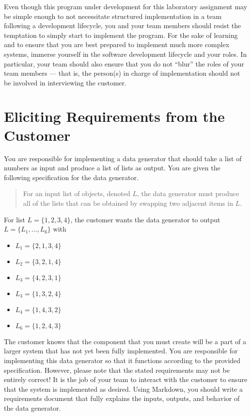 Even though this program under development for this laboratory assignment may be simple enough to not necessitate
structured implementation in a team following a development lifecycle, you and your team members should resist the
temptation to simply start to implement the program. For the sake of learning and to ensure that you are best prepared
to implement much more complex systems, immerse yourself in the software development lifecycle and your roles. In
particular, your team should also ensure that you do not ``blur'' the roles of your team members --- that is, the
person(s) in charge of implementation should not be involved in interviewing the customer.

\section*{Eliciting Requirements from the Customer}

You are responsible for implementing a data generator that should take a list of numbers as input and produce a list of
lists as output.  You are given the following specification for the data generator.

\begin{quote}
For an input list of objects, denoted $L$, the data generator must produce all of the lists that can be obtained by swapping two
adjacent items in $L$.
\end{quote}

\noindent
For list $L = \{1, 2, 3, 4\}$, the customer wants the data generator to output $L=\{L_1, \ldots, L_6\}$ with

\begin{itemize}
    \item[] $L_1 = \{2, 1, 3, 4\}$
    \item[] $L_2 = \{3, 2, 1, 4\}$
    \item[] $L_3 = \{4, 2, 3, 1\}$
    \item[] $L_3 = \{1, 3, 2, 4\}$
    \item[] $L_4 = \{1, 4, 3, 2\}$
    \item[] $L_6 = \{1, 2, 4, 3\}$
\end{itemize}

The customer knows that the component that you must create will be a part of a larger system that has not yet been
fully implemented.  You are responsible for implementing this data generator so that it functions according to the
provided specification.  However, please note that the stated requirements may not be entirely correct!  It is the job
of your team to interact with the customer to ensure that the system is implemented as desired.  Using Markdown, you
should write a requirements document that fully explains the inputs, outputs, and behavior of the data generator.

